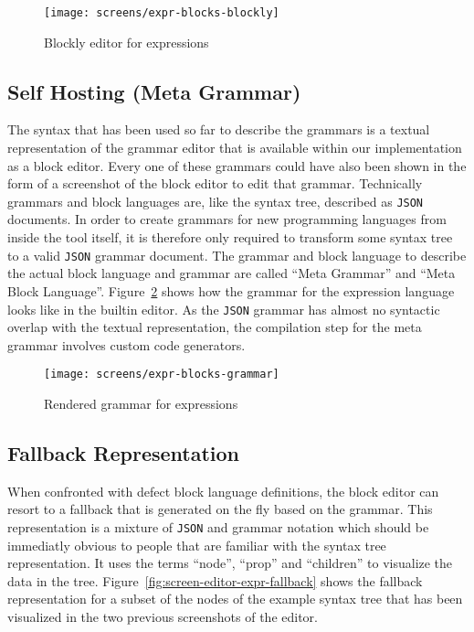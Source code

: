 \documentclass[sigconf,natbib=false]{acmart}
\begin{document}
\begin{figure}[H]
  \texttt{[image: screens/expr-blocks-blockly]}
  \caption{Blockly editor for expressions}
  \label{fig:screen-editor-expr-blockly}
\end{figure}

\subsection{Self Hosting (Meta Grammar)}

The syntax that has been used so far to describe the grammars is a textual representation of the grammar editor that is available within our implementation as a block editor. Every one of these grammars could have also been shown in the form of a screenshot of the block editor to edit that grammar. Technically grammars and block languages are, like the syntax tree, described as \texttt{JSON} documents. In order to create grammars for new programming languages from inside the tool itself, it is therefore only required to transform some syntax tree to a valid \texttt{JSON} grammar document. The grammar and block language to describe the actual block language and grammar are called \enquote{Meta Grammar} and \enquote{Meta Block Language}. Figure~\ref{fig:screen-editor-expr-grammar} shows how the grammar for the expression language looks like in the builtin editor. As the \texttt{JSON} grammar has almost no syntactic overlap with the textual representation, the compilation step for the meta grammar involves custom code generators.

\begin{figure}
  \texttt{[image: screens/expr-blocks-grammar]}
  \caption{Rendered grammar for expressions}
  \label{fig:screen-editor-expr-grammar}
\end{figure}

\subsection{Fallback Representation}

When confronted with defect block language definitions, the block editor can resort to a fallback that is generated on the fly based on the grammar. This representation is a mixture of \texttt{JSON} and grammar notation which should be immediatly obvious to people that are familiar with the syntax tree representation. It uses the terms \enquote{node}, \enquote{prop} and \enquote{children} to visualize the data in the tree. Figure~\ref{fig:screen-editor-expr-fallback} shows the fallback representation for a subset of the nodes of the example syntax tree that has been visualized in the two previous screenshots of the editor.
\end{document}
